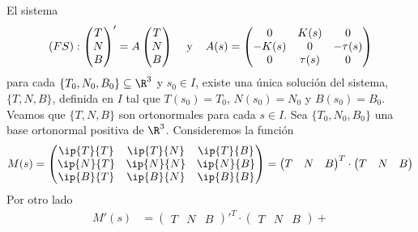 \documentclass{article}
\begin{document}
\begin{dem}
    El sistema
    \begin{equation*}
        (FS):\begin{pmatrix}
            T \\ N \\ B
        \end{pmatrix}'
        =A
        \begin{pmatrix}
            T \\ N \\ B
        \end{pmatrix}
        \hspace{4mm}\text{y}\hspace{4mm}A(s)=
        \begin{pmatrix}
            0 & K(s) & 0 \\
            -K(s) & 0 & -\tau(s) \\
            0 & \tau(s) & 0
        \end{pmatrix}
    \end{equation*}
    para cada $\{T_{0},N_{0},B_{0}\}\subseteq\R^{3}$ y $s_{0}\in I$, existe una única solución del
    sistema, $\{T, N, B\}$, definida en $I$ tal que $T(s_{0})=T_{0}$, $N(s_{0})=N_{0}$ y 
    $B(s_{0})=B_{0}$. Veamos que $\{T,N,B\}$ son ortonormales para cada  $s\in I$. Sea
    $\{T_{0},N_{0},B_{0}\}$ una base ortonormal positiva de $\R^{3}$. Consideremos la función
    \begin{equation*}
        M(s)=
        \begin{pmatrix}
            \ip{T}{T} & \ip{T}{N} & \ip{T}{B} \\
            \ip{N}{T} & \ip{N}{N} & \ip{N}{B} \\
            \ip{B}{T} & \ip{B}{N} & \ip{B}{B}
        \end{pmatrix}
        =
        \begin{pmatrix}
            T & N & B
        \end{pmatrix}^{T}\cdot
        \begin{pmatrix}
            T & N & B
        \end{pmatrix}
    \end{equation*}
    Por otro lado
    \begin{align*}
        M'(s) &=
        \begin{pmatrix}
            T & N & B
        \end{pmatrix}'^{T}\cdot
        \begin{pmatrix}
            T & N & B
        \end{pmatrix}+

\end{align*}
\end{dem}
\end{document}
